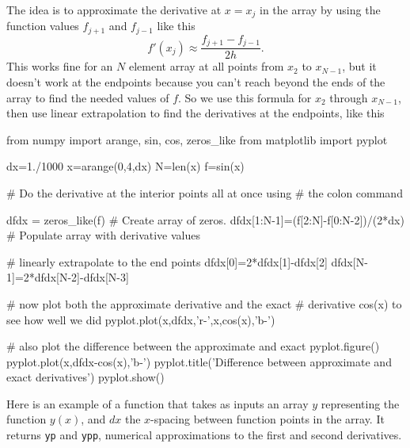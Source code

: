The idea is to approximate the derivative at $x=x_j$ in the array by using
the function values $f_{j+1}$ and $f_{j-1}$ like this
\begin{equation}
f'(x_j) \approx \frac{f_{j+1}-f_{j-1} }{ 2 h} .
\end{equation}
This works fine for an $N$ element array at all points from $x_2$ to
$x_{N-1}$, but it doesn't work at the endpoints because you can't reach
beyond the ends of the array to find the needed values of $f$. So we use this
formula for $x_2$ through $x_{N-1}$, then use linear extrapolation to find
the derivatives at the endpoints, like this
\begin{codeexample}
\begin{VerbatimOut}{\listingFile}
from numpy import arange, sin, cos, zeros_like
from matplotlib import pyplot

dx=1./1000
x=arange(0,4,dx)
N=len(x)
f=sin(x)

# Do the derivative at the interior points all at once using
# the colon command

dfdx = zeros_like(f)  # Create array of zeros.
dfdx[1:N-1]=(f[2:N]-f[0:N-2])/(2*dx)  # Populate array with derivative values

# linearly extrapolate to the end points
dfdx[0]=2*dfdx[1]-dfdx[2]
dfdx[N-1]=2*dfdx[N-2]-dfdx[N-3]

# now plot both the approximate derivative and the exact
# derivative cos(x) to see how well we did
pyplot.plot(x,dfdx,'r-',x,cos(x),'b-')

# also plot the difference between the approximate and exact
pyplot.figure()
pyplot.plot(x,dfdx-cos(x),'b-') 
pyplot.title('Difference between approximate and exact derivatives')
pyplot.show()
\end{VerbatimOut}
\end{codeexample}

Here is an example of a function that takes as inputs an array $y$
representing the function $y(x)$, and $dx$ the $x$-spacing between function
points in the array. It returns {\tt yp} and {\tt ypp}, numerical
approximations to the first and second derivatives. 

